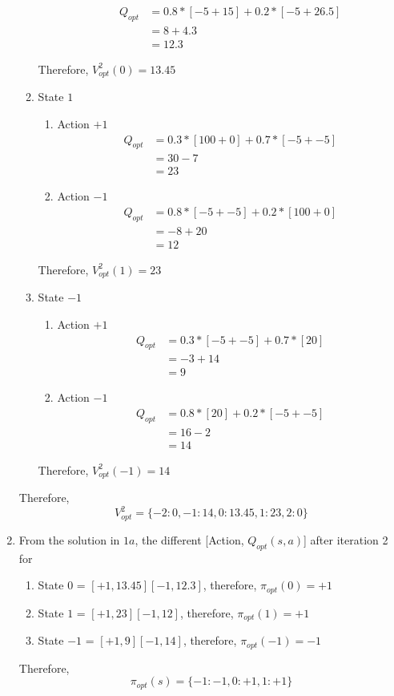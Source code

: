 \documentclass[12pt]{article}
\begin{document}
\begin{enumerate}[label=(\alph*)]
\begin{enumerate}
\begin{enumerate}
\begin{align*}
	 Q_{opt} &= 0.8 * [-5 + 15] + 0.2 * [-5 + 26.5] \\
	 &= 8 + 4.3 \\
	 &= 12.3
	 \end{align*}
 \end{enumerate}
 Therefore, $V_{opt}^2(0) = 13.45$
 \item State $1$
	\begin{enumerate}
		\item Action $+1$ \\
			\begin{align*}
				Q_{opt} &= 0.3 * [100 + 0] + 0.7 * [-5 + -5] \\
				&= 30 - 7 \\
				&= 23
			\end{align*}
		\item Action $-1$ \\
			\begin{align*}
				Q_{opt} &= 0.8 * [-5 + -5] + 0.2 * [100 + 0] \\
				&= -8 + 20 \\
				&= 12
			\end{align*}
	\end{enumerate}
	Therefore, $V_{opt}^2(1) = 23$
\item State $-1$
	\begin{enumerate}
		\item Action $+1$
			\begin{align*}
				Q_{opt} &= 0.3 * [-5 + -5] + 0.7 * [20] \\
				&= -3 + 14 \\
				&= 9
			\end{align*}
		\item Action $-1$
			\begin{align*}
				Q_{opt} &= 0.8 * [20] + 0.2 * [-5 + -5] \\
				&= 16 - 2 \\
				&= 14
			\end{align*}
	\end{enumerate}
	Therefore, $V_{opt}^2(-1) = 14$
 \end{enumerate}
 Therefore, $$V_{opt}^2 = \{ -2: 0, -1: 14, 0: 13.45, 1: 23, 2: 0\}$$
  \item From the solution in $1a$, the different [Action, $Q_{opt}(s,a)$] after iteration 2 for
  	\begin{enumerate}
  		\item State $0$ = $[+1, 13.45] [-1, 12.3]$, therefore, $\pi_{opt}(0) = +1$
  		\item State $1$ = $[+1, 23] [-1, 12]$, therefore, $\pi_{opt}(1) = +1$
  		\item State $-1$ = $[+1, 9] [-1, 14]$, therefore, $\pi_{opt}(-1) = -1$
  	\end{enumerate}
  	Therefore, $$\pi_{opt}(s) = \{ -1: -1, 0: +1, 1: +1 \}$$
\end{enumerate}
\end{document}

